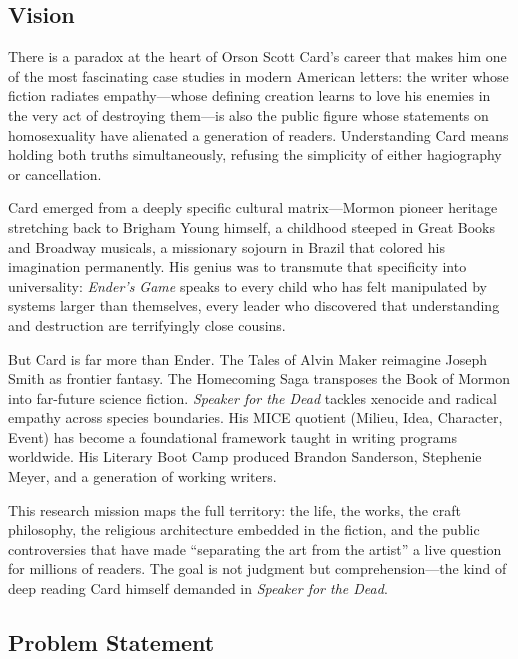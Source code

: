 \documentclass[11pt,letterpaper]{article}
\begin{document}
\subsection{Vision}

There is a paradox at the heart of Orson Scott Card's career that makes him one of the most fascinating case studies in modern American letters: the writer whose fiction radiates empathy---whose defining creation learns to love his enemies in the very act of destroying them---is also the public figure whose statements on homosexuality have alienated a generation of readers. Understanding Card means holding both truths simultaneously, refusing the simplicity of either hagiography or cancellation.

Card emerged from a deeply specific cultural matrix---Mormon pioneer heritage stretching back to Brigham Young himself, a childhood steeped in Great Books and Broadway musicals, a missionary sojourn in Brazil that colored his imagination permanently. His genius was to transmute that specificity into universality: \textit{Ender's Game} speaks to every child who has felt manipulated by systems larger than themselves, every leader who discovered that understanding and destruction are terrifyingly close cousins.

But Card is far more than Ender. The Tales of Alvin Maker reimagine Joseph Smith as frontier fantasy. The Homecoming Saga transposes the Book of Mormon into far-future science fiction. \textit{Speaker for the Dead} tackles xenocide and radical empathy across species boundaries. His MICE quotient (Milieu, Idea, Character, Event) has become a foundational framework taught in writing programs worldwide. His Literary Boot Camp produced Brandon Sanderson, Stephenie Meyer, and a generation of working writers.

This research mission maps the full territory: the life, the works, the craft philosophy, the religious architecture embedded in the fiction, and the public controversies that have made ``separating the art from the artist'' a live question for millions of readers. The goal is not judgment but comprehension---the kind of deep reading Card himself demanded in \textit{Speaker for the Dead}.

\subsection{Problem Statement}
\end{document}
